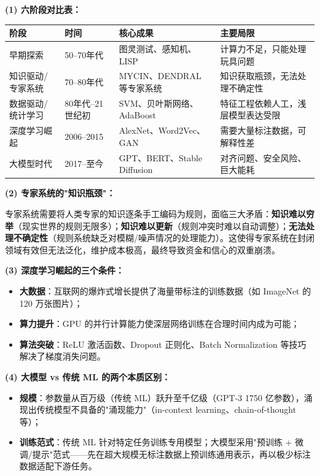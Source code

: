 \documentclass[a4paper,11pt]{ctexart}
\begin{document}
\begin{solutionbox}[参考答案与详细解析]
    \textbf{(1) 六阶段对比表：}
    \begin{center}
    \begin{tabular}{p{3.5cm} p{2.5cm} p{3.5cm} p{3cm}}
        \toprule
        阶段 & 时间 & 核心成果 & 主要局限 \\
        \midrule
        早期探索 & 50--70年代 & 图灵测试、感知机、LISP & 计算力不足，只能处理玩具问题 \\[0.8em]
        知识驱动/专家系统 & 70--80年代 & MYCIN、DENDRAL 等专家系统 & 知识获取瓶颈，无法处理不确定性 \\[0.8em]
        数据驱动/统计学习 & 80年代--21世纪初 & SVM、贝叶斯网络、AdaBoost & 特征工程依赖人工，浅层模型表达受限 \\[0.8em]
        深度学习崛起 & 2006--2015 & AlexNet、Word2Vec、GAN & 需要大量标注数据，可解释性差 \\[0.8em]
        大模型时代 & 2017--至今 & GPT、BERT、Stable Diffusion & 对齐问题、安全风险、巨大能耗 \\
        \bottomrule
    \end{tabular}
    \end{center}

    \textbf{(2) 专家系统的"知识瓶颈"：}

    专家系统需要将人类专家的知识逐条手工编码为规则，面临三大矛盾：\textbf{知识难以穷举}（现实世界的规则无限多）；\textbf{知识难以更新}（规则冲突时难以自动调整）；\textbf{无法处理不确定性}（规则系统缺乏对模糊/噪声情况的处理能力）。这使得专家系统在封闭领域有效但无法泛化，维护成本极高，最终导致资金和信心的双重崩溃。

    \textbf{(3) 深度学习崛起的三个条件：}
    \begin{itemize}
        \item \textbf{大数据}：互联网的爆炸式增长提供了海量带标注的训练数据（如 ImageNet 的 120 万张图片）；
        \item \textbf{算力提升}：GPU 的并行计算能力使深层网络训练在合理时间内成为可能；
        \item \textbf{算法突破}：ReLU 激活函数、Dropout 正则化、Batch Normalization 等技巧解决了梯度消失问题。
    \end{itemize}

    \textbf{(4) 大模型 vs 传统 ML 的两个本质区别：}
    \begin{itemize}
        \item \textbf{规模}：参数量从百万级（传统 ML）跃升至千亿级（GPT-3 1750 亿参数），涌现出传统模型不具备的"涌现能力"（in-context learning、chain-of-thought 等）；
        \item \textbf{训练范式}：传统 ML 针对特定任务训练专用模型；大模型采用"预训练 + 微调/提示"范式——先在超大规模无标注数据上预训练通用表示，再以极少标注数据适配下游任务。
    \end{itemize}
\end{solutionbox}
\end{document}

